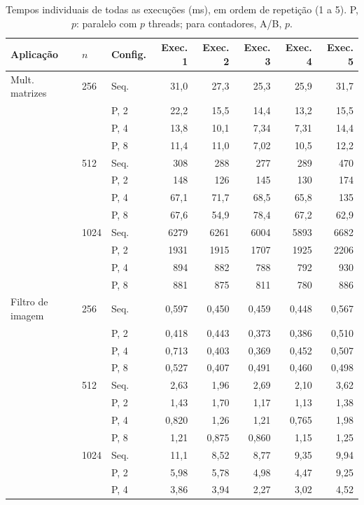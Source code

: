 \documentclass[12pt,a4paper]{article}
\begin{document}
\begin{table}[h]
\caption{Tempos individuais de todas as execuções (ms), em ordem de repetição (1 a 5). P, $p$: paralelo com $p$ threads; para contadores, A/B, $p$.}
\label{tab:apend}
\centering\footnotesize
\begin{tabular}{@{}lllrrrrr@{}}
\toprule
Aplicação & $n$ & Config. & Exec. 1 & Exec. 2 & Exec. 3 & Exec. 4 & Exec. 5 \\
\midrule
Mult. matrizes & 256 & Seq. & 31,0 & 27,3 & 25,3 & 25,9 & 31,7 \\
 &  & P, 2 & 22,2 & 15,5 & 14,4 & 13,2 & 15,5 \\
 &  & P, 4 & 13,8 & 10,1 & 7,34 & 7,31 & 14,4 \\
 &  & P, 8 & 11,4 & 11,0 & 7,02 & 10,5 & 12,2 \\
\addlinespace[2pt]
 & 512 & Seq. & 308 & 288 & 277 & 289 & 470 \\
 &  & P, 2 & 148 & 126 & 145 & 130 & 174 \\
 &  & P, 4 & 67,1 & 71,7 & 68,5 & 65,8 & 135 \\
 &  & P, 8 & 67,6 & 54,9 & 78,4 & 67,2 & 62,9 \\
\addlinespace[2pt]
 & 1024 & Seq. & 6279 & 6261 & 6004 & 5893 & 6682 \\
 &  & P, 2 & 1931 & 1915 & 1707 & 1925 & 2206 \\
 &  & P, 4 & 894 & 882 & 788 & 792 & 930 \\
 &  & P, 8 & 881 & 875 & 811 & 780 & 886 \\
\addlinespace[2pt]
\midrule
Filtro de imagem & 256 & Seq. & 0,597 & 0,450 & 0,459 & 0,448 & 0,567 \\
 &  & P, 2 & 0,418 & 0,443 & 0,373 & 0,386 & 0,510 \\
 &  & P, 4 & 0,713 & 0,403 & 0,369 & 0,452 & 0,507 \\
 &  & P, 8 & 0,527 & 0,407 & 0,491 & 0,460 & 0,498 \\
\addlinespace[2pt]
 & 512 & Seq. & 2,63 & 1,96 & 2,69 & 2,10 & 3,62 \\
 &  & P, 2 & 1,43 & 1,70 & 1,17 & 1,13 & 1,38 \\
 &  & P, 4 & 0,820 & 1,26 & 1,21 & 0,765 & 1,98 \\
 &  & P, 8 & 1,21 & 0,875 & 0,860 & 1,15 & 1,25 \\
\addlinespace[2pt]
 & 1024 & Seq. & 11,1 & 8,52 & 8,77 & 9,35 & 9,94 \\
 &  & P, 2 & 5,98 & 5,78 & 4,98 & 4,47 & 9,25 \\
 &  & P, 4 & 3,86 & 3,94 & 2,27 & 3,02 & 4,52 \\

\end{tabular}
\end{table}
\end{document}
